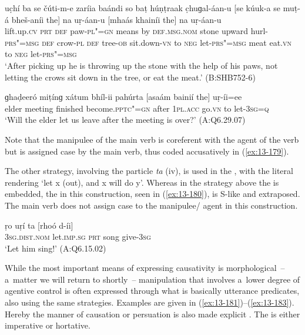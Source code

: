 \begin{exe}
\ex
\label{ex:13-178}
\gll uc̣hí ba se čúti-m-e zaríia baándi  so baṭ húṇṭraak c̣huɡal-áan-u [se kúuk-a se muṭ-á bheš-aníi the] na  uṛ-áan-u \textsc{[}mhaás
  khainíi the] na uṛ-áan-u \\
lift.up.\textsc{cv} \textsc{prt} \textsc{def} paw-\textsc{pl"=gn} means by  \textsc{def.msg.nom} stone upward hurl-\textsc{prs"=msg}  \textsc{def} crow-\textsc{pl} \textsc{def} tree-\textsc{ob} sit.down-\textsc{vn} to \textsc{neg} let-\textsc{prs"=msg} meat eat.\textsc{vn} to \textsc{neg} let-\textsc{prs"=msg} \\
\glt `After picking up he is throwing up the stone with the help of his paws, not letting the crows sit down in the tree, or eat the meat.' (B:SHB752-6)

\ex
\label{ex:13-179}
\gll ɡhaḍeeró miṭínɡ xátum bhíl-ii pahúrta [asaám  bainií the] uṛ-íi=ee \\
elder meeting finished become.\textsc{pptc"=gn} after \textsc{1pl.acc} go.\textsc{vn} to let-\textsc{3sg=q} \\
\glt `Will the elder let us leave after the meeting is over?' (A:Q6.29.07) 
\end{exe}

Note that the manipulee of the main verb is coreferent with the agent of the  verb but is assigned case by the main verb, thus coded accusatively in (\ref{ex:13-179}).


The other strategy, involving the particle \textit{ta} (iv), is used in the , with the literal rendering `let x (out), and x will do y'. Whereas in the strategy above the  is embedded, the  in this construction, seen in (\ref{ex:13-180}), is S-like and extraposed. The main verb does not assign case to the manipulee/ agent in this construction.

\begin{exe}
\ex
\label{ex:13-180}
\gll ṛo uṛí ta [rhoó d-íi] \\
\textsc{3sg.dist.nom} let.\textsc{imp.sg} \textsc{ prt} song give-\textsc{3sg} \\
\glt `Let him sing!' (A:Q6.15.02) 
\end{exe}

 While the most important means of expressing causativity is morphological~-- a~matter we will return to shortly~-- manipulation that involves a~lower degree of agentive control \citep[45]{givon2001b} is often expressed through what is basically utterance predicates, also using the same strategies. Examples are given in (\ref{ex:13-181})--(\ref{ex:13-183}). Hereby the manner of causation or persuation is also made explicit \citep[136]{noonan2007}. The  is either imperative or hortative.

